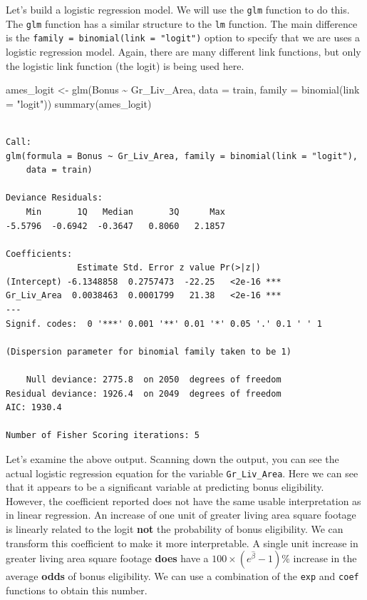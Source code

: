 \documentclass[
  letterpaper,
  DIV=11,
  numbers=noendperiod]{scrreprt}
\newenvironment{Shaded}{\begin{snugshade}}{\end{snugshade}}
\newcommand{\AttributeTok}[1]{\textcolor[rgb]{0.40,0.45,0.13}{#1}}
\newcommand{\FunctionTok}[1]{\textcolor[rgb]{0.28,0.35,0.67}{#1}}
\newcommand{\NormalTok}[1]{\textcolor[rgb]{0.00,0.23,0.31}{#1}}
\newcommand{\OtherTok}[1]{\textcolor[rgb]{0.00,0.23,0.31}{#1}}
\newcommand{\SpecialCharTok}[1]{\textcolor[rgb]{0.37,0.37,0.37}{#1}}
\newcommand{\StringTok}[1]{\textcolor[rgb]{0.13,0.47,0.30}{#1}}
\begin{document}
Let's build a logistic regression model. We will use the \texttt{glm}
function to do this. The \texttt{glm} function has a similar structure
to the \texttt{lm} function. The main difference is the
\texttt{family\ =\ binomial(link\ =\ "logit")} option to specify that we
are uses a logistic regression model. Again, there are many different
link functions, but only the logistic link function (the logit) is being
used here.

\begin{Shaded}
\begin{Highlighting}[]
\NormalTok{ames\_logit }\OtherTok{\textless{}{-}} \FunctionTok{glm}\NormalTok{(Bonus }\SpecialCharTok{\textasciitilde{}}\NormalTok{ Gr\_Liv\_Area, }
                   \AttributeTok{data =}\NormalTok{ train, }\AttributeTok{family =} \FunctionTok{binomial}\NormalTok{(}\AttributeTok{link =} \StringTok{"logit"}\NormalTok{))}
\FunctionTok{summary}\NormalTok{(ames\_logit)}
\end{Highlighting}
\end{Shaded}

\begin{verbatim}

Call:
glm(formula = Bonus ~ Gr_Liv_Area, family = binomial(link = "logit"), 
    data = train)

Deviance Residuals: 
    Min       1Q   Median       3Q      Max  
-5.5796  -0.6942  -0.3647   0.8060   2.1857  

Coefficients:
              Estimate Std. Error z value Pr(>|z|)    
(Intercept) -6.1348858  0.2757473  -22.25   <2e-16 ***
Gr_Liv_Area  0.0038463  0.0001799   21.38   <2e-16 ***
---
Signif. codes:  0 '***' 0.001 '**' 0.01 '*' 0.05 '.' 0.1 ' ' 1

(Dispersion parameter for binomial family taken to be 1)

    Null deviance: 2775.8  on 2050  degrees of freedom
Residual deviance: 1926.4  on 2049  degrees of freedom
AIC: 1930.4

Number of Fisher Scoring iterations: 5
\end{verbatim}

Let's examine the above output. Scanning down the output, you can see
the actual logistic regression equation for the variable
\texttt{Gr\_Liv\_Area}. Here we can see that it appears to be a
significant variable at predicting bonus eligibility. However, the
coefficient reported does not have the same usable interpretation as in
linear regression. An increase of one unit of greater living area square
footage is linearly related to the logit \textbf{not} the probability of
bonus eligibility. We can transform this coefficient to make it more
interpretable. A single unit increase in greater living area square
footage \textbf{does} have a \(100 \times (e^\hat{\beta}-1)\%\) increase
in the average \textbf{odds} of bonus eligibility. We can use a
combination of the \texttt{exp} and \texttt{coef} functions to obtain
this number.
\end{document}
